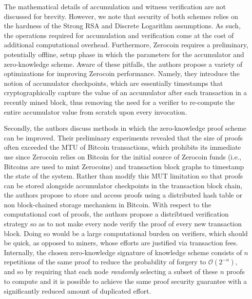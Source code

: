 
The mathematical details of accumulation and witness verification are not discussed for brevity. However, we note that security of both schemes relies on the hardness of the Strong RSA and Discrete Logarithm assumptions. As such, the operations required for accumulation and verification come at the cost of additional computational overhead. Furthermore, Zerocoin requires a preliminary, potentially offline, setup phase in which the parameters for the accumulator and zero-knowledge scheme. Aware of these pitfalls, the authors propose a variety of optimizations for improving Zerocoin performance. Namely, they introduce the notion of accumulator checkpoints, which are essentially timestamps that cryptographically capture the value of an accumulator after each transaction in a recently mined block, thus removing the need for a verifier to re-compute the entire accumulator value from scratch upon every invocation. 

Secondly, the authors discuss methods in which the zero-knowledge proof scheme can be improved. Their preliminary experiments revealed that the size of proofs often exceeded the MTU of Bitcoin transactions, which prohibits its immediate use since Zerocoin relies on Bitcoin for the initial source of Zerocoin funds (i.e., Bitcoins are used to mint Zerocoins) and transaction block graphs to timestamp the state of the system. Rather than modify this MUT limitation so that proofs can be stored alongside accumulator checkpoints in the transaction block chain, the authors propose to store and access proofs using a distributed hash table or non block-chained storage mechanism in Bitcoin. With respect to the computational cost of proofs, the authors propose a distribtued verification strategy so as to not make every node verify the proof of every new transaction block. Doing so would be a large computational burden on verifiers, which should be quick, as opposed to miners, whose efforts are justified via transaction fees. Internally, the chosen zero-knowledge signature of knowledge scheme consists of $n$ repetitions of the same proof to reduce the probability of forgery to $\mathcal{O}(2^{-n})$, and so by requiring that each node \emph{randomly} selecting a subset of these $n$ proofs to compute and it is possible to achieve the same proof security guarantee with a significantly reduced amount of duplicated effort.


